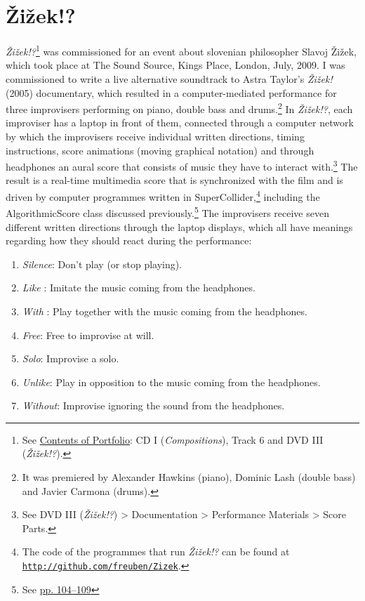 \section{\v{Z}i\v{z}ek!?}

\emph{\v{Z}i\v{z}ek!?}\footnote{See \hyperlink{portfolio}{Contents of Portfolio}: CD I (\emph{Compositions}), Track 6 and DVD III (\emph{\v{Z}i\v{z}ek!?}).} was commissioned for an event about slovenian philosopher Slavoj \v{Z}i\v{z}ek, which took place at The Sound Source, Kings Place, London, July, 2009. I was commissioned to write a live alternative soundtrack to Astra Taylor's \emph{\v{Z}i\v{z}ek!} (2005) documentary, which resulted in a \mbox{computer-mediated} performance for three improvisers performing on piano, double bass and drums.\footnote{It was premiered by Alexander Hawkins (piano), Dominic Lash (double bass) and Javier Carmona (drums).} In \emph{\v{Z}i\v{z}ek!?}, each improviser has a laptop in front of them, connected through a computer network by which the improvisers receive individual written directions, timing instructions, score animations (moving graphical notation) and through headphones an aural score that consists of music they have to interact with.\footnote{See DVD III (\emph{\v{Z}i\v{z}ek!?}) \tiny \textgreater \footnotesize \hspace{0pt} Documentation \tiny \textgreater \footnotesize \hspace{0pt} Performance Materials \tiny \textgreater \footnotesize \hspace{0pt} Score Parts.} The result is a real-time multimedia score that is synchronized with the film and is driven by computer programmes written in SuperCollider,\footnote{The code of the programmes that run \emph{\v{Z}i\v{z}ek!?} can be found at \href{http://github.com/freuben/Zizek}{\texttt {http://github.com/freuben/Zizek}}.} including the AlgorithmicScore class discussed previously.\footnote{See \hyperlink{algoscore}{pp. 104--109}} The improvisers receive seven different written directions through the laptop displays, which all have meanings regarding how they should react during the performance:
\begin{enumerate}
\item \emph{Silence}: Don't play (or stop playing).
\item \emph{Like} : Imitate the music coming from the headphones.
\item \emph{With} : Play together with the music coming from the headphones.
\item \emph{Free}: Free to improvise at will.
\item \emph{Solo}: Improvise a solo.
\item \emph{Unlike}: Play in opposition to the music coming from the headphones. 
\item \emph{Without}: Improvise ignoring the sound from the headphones.
\end{enumerate}
